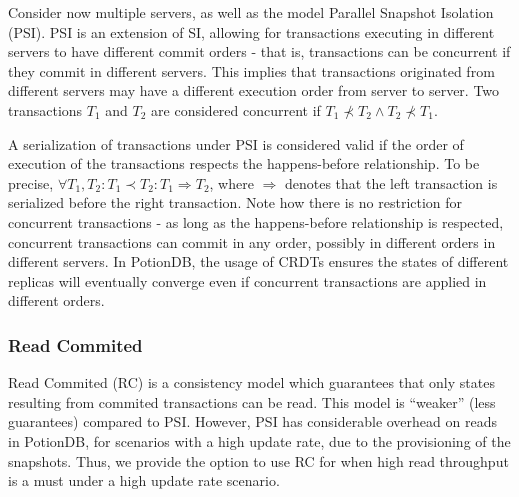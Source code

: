 \documentclass{vldb}
\newcommand{\grumbler}[2]{{\color{red}{\bf #1:} #2}}
\renewcommand{\grumbler}[2]{}
\newcommand{\andre}[1]{\grumbler{andre}{#1}}
\begin{document}
\andre{Anything else I need to define for snapshot isolation?}

Consider now multiple servers, as well as the model Parallel Snapshot Isolation (PSI).
PSI is an extension of SI, allowing for transactions executing in different servers to have different commit orders - that is, transactions can be concurrent if they commit in different servers.
This implies that transactions originated from different servers may have a different execution order from server to server.
Two transactions $T_1$ and $T_2$ are considered concurrent if $T_1 \not\prec  T_2 \land T_2 \not\prec  T_1$.


A serialization of transactions under PSI is considered valid if the order of execution of the transactions respects the happens-before relationship.
To be precise, $\forall T_1, T_2 : T_1 \prec T_2 : T_1 \Rightarrow T_2$, where $\Rightarrow$ denotes that the left transaction is serialized before the right transaction.
Note how there is no restriction for concurrent transactions - as long as the happens-before relationship is respected, concurrent transactions can commit in any order, possibly in different orders in different servers.
In PotionDB, the usage of CRDTs ensures the states of different replicas will eventually converge even if concurrent transactions are applied in different orders.

\andre{Section \ref{subsec:partialReplicationViews} describes the implications of partial replication in keeping views up-to-date. Do I need to refer that section here?}

\subsubsection{Read Commited}

Read Commited (RC) is a consistency model which guarantees that only states resulting from commited transactions can be read.
This model is ``weaker'' (less guarantees) compared to PSI.
However, PSI has considerable overhead on reads in PotionDB, for scenarios with a high update rate, due to the provisioning of the snapshots.
Thus, we provide the option to use RC for when high read throughput is a must under a high update rate scenario.
\end{document}
